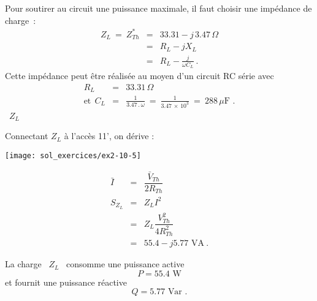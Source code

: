 
Pour soutirer au circuit une puissance maximale, il faut choisir une impédance de charge~:
\begin{eqnarray*}
	Z_L \: = \: Z_{Th}^{\ast} &=& 33.31 - j\, 3.47 \, \Omega\\
	&=& R_L - jX_L\\
	& = & R_L - \frac{j}{\omega C_L}~. 
\end{eqnarray*}
Cette impédance peut \^etre réalisée au moyen d'un circuit RC série
avec
\begin{eqnarray*}
	R_L &=& 33.31 \, \Omega\\
	\mbox{et}~~C_L &=& \frac{1}{3.47\, . \, \omega} \: = \: \frac{1}{3.47\, \times \, 10^3} 
	\: = \: 288 \, \mu \text{F~.}
\end{eqnarray*}
 \ $Z_L$

Connectant $Z_L$ à l'accès 11', on dérive :

\parbox[c]{5cm}{
	\texttt{[image: sol\_exercices/ex2-10-5]}}
\parbox[c]{5cm}{
	\begin{eqnarray*}
		\bar{I} & = &  \dfrac{\bar{V}_{Th}}{2R_{Th}}\\
		S_{Z_L} & = & Z_L  I^2 \\
		& =&  Z_L \dfrac{V_{Th}^2}{4R_{Th}^2} \\
		&= & 55.4 - j 5.77 \,\,  \text{VA}~. 
\end{eqnarray*}}

La charge \ $Z_L$ \ consomme une puissance active 
\[ P = 55.4 \,\, \text{W} \]
et fournit une puissance réactive
\[ Q = 5.77 \,\, \text{Var~.} \]

